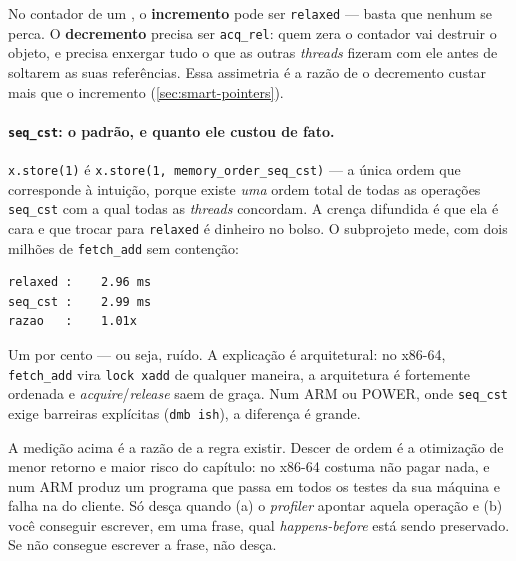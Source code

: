 \begin{regra}
No contador de um , o \textbf{incremento} pode ser
\texttt{relaxed} --- basta que nenhum se perca. O \textbf{decremento} precisa ser
\texttt{acq\_rel}: quem zera o contador vai destruir o objeto, e precisa
enxergar tudo o que as outras \emph{threads} fizeram com ele antes de soltarem
as suas referências. Essa assimetria é a razão de o decremento custar mais que o
incremento (\cref{sec:smart-pointers}).
\end{regra}

\paragraph{\texttt{seq\_cst}: o padrão, e quanto ele custou de fato.}
\texttt{x.store(1)} é \texttt{x.store(1, memory\_order\_seq\_cst)} --- a única
ordem que corresponde à intuição, porque existe \emph{uma} ordem total de todas
as operações \texttt{seq\_cst} com a qual todas as \emph{threads} concordam. A
crença difundida é que ela é cara e que trocar para \texttt{relaxed} é dinheiro
no bolso. O subprojeto mede, com dois milhões de \texttt{fetch\_add} sem
contenção:

\begin{lstlisting}[style=bt, language=bash,
    caption={Saída de \texttt{src/concurrency2/}: dois milhões de
             \texttt{fetch\_add} numa \emph{thread} só, x86-64.}]
relaxed :    2.96 ms
seq_cst :    2.99 ms
razao   :    1.01x
\end{lstlisting}

Um por cento --- ou seja, ruído. A explicação é arquitetural: no x86-64,
\texttt{fetch\_add} vira \texttt{lock xadd} de qualquer maneira, a arquitetura é
fortemente ordenada e \emph{acquire}/\emph{release} saem de graça. Num ARM ou
POWER, onde \texttt{seq\_cst} exige barreiras explícitas (\texttt{dmb ish}), a
diferença é grande.

\begin{regra}
A medição acima é a razão de a regra existir. Descer de ordem é a otimização de
menor retorno e maior risco do capítulo: no x86-64 costuma não pagar nada, e num
ARM produz um programa que passa em todos os testes da sua máquina e falha na do
cliente. Só desça quando (a) o \emph{profiler} apontar aquela operação e (b)
você conseguir escrever, em uma frase, qual \emph{happens-before} está sendo
preservado. Se não consegue escrever a frase, não desça.
\end{regra}


